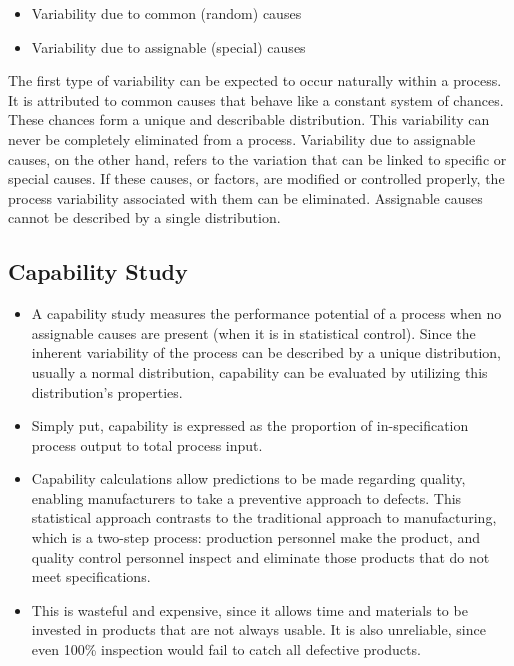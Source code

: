 \documentclass[]{article}
\begin{document}
\begin{itemize}
\item Variability due to common (random) causes
\item Variability due to assignable (special) causes
\end{itemize}
The first type of variability can be expected to occur naturally within a process. It is attributed to common causes that behave like a constant system of chances. These chances form a unique and describable distribution. This variability can never be completely eliminated from a process. Variability due to assignable causes, on the other hand, refers to the variation that can be linked to specific or special causes. If these causes, or factors, are modified or controlled properly, the process variability associated with them can be eliminated. Assignable causes cannot be described by a single distribution.
\newpage
\subsection{Capability Study} 
\large
\begin{itemize}
\item A capability study measures the performance potential of a process when no assignable causes are present (when it is in statistical control). Since the inherent variability of the process can be described by a unique distribution, usually a normal distribution, capability can be evaluated by utilizing this distribution’s properties. 
\item Simply put, capability is expressed as the proportion of in-specification process output to total process input.

\item Capability calculations allow predictions to be made regarding quality, enabling manufacturers to take a preventive approach to defects. This statistical approach contrasts to the traditional approach to manufacturing, which is a two-step process: production personnel make the product, and quality control personnel inspect and eliminate those products that do not meet specifications. \item This is wasteful and expensive, since it allows time and materials to be invested in products that are not always usable. It is also unreliable, since even 100\% inspection would fail to catch all defective products.
\end{itemize}
\end{document}
